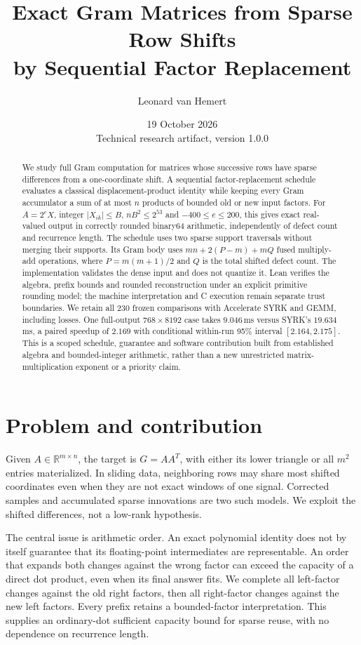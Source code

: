 \documentclass[10pt,a4paper]{article}
\title{Exact Gram Matrices from Sparse Row Shifts\\by Sequential Factor Replacement}
\author{Leonard van Hemert}
\date{19 October 2026\\Technical research artifact, version 1.0.0}
\newcommand{\R}{\mathbb R}
\newcommand{\abs}[1]{\lvert#1\rvert}
\begin{document}
\maketitle
\begin{abstract}
We study full Gram computation for matrices whose successive rows have sparse
differences from a one-coordinate shift. A sequential factor-replacement schedule
evaluates a classical displacement-product identity while keeping every Gram
accumulator a sum of at most $n$ products of bounded old or new input factors.
For $A=2^eX$, integer $\abs{X_{ik}}\le B$, $nB^2\le2^{53}$ and
$-400\le e\le200$, this gives exact real-valued output in correctly rounded
binary64 arithmetic, independently of defect count and recurrence length.
The schedule uses two sparse support traversals without merging their supports.
Its Gram body uses $mn+2(P-m)+mQ$ fused multiply-add operations, where
$P=m(m+1)/2$ and $Q$ is the total shifted defect count. The implementation
validates the dense input and does not quantize it. Lean verifies the algebra,
prefix bounds and rounded reconstruction under an explicit primitive rounding
model; the machine interpretation and C execution remain separate trust
boundaries. We retain all 230 frozen comparisons with Accelerate SYRK and GEMM,
including losses. One full-output $768\times8192$ case takes $9.046$\,ms versus
SYRK's $19.634$\,ms, a paired speedup of $2.169$ with conditional within-run
95\% interval $[2.164,2.175]$. This is a scoped schedule, guarantee and software
contribution built from established algebra and bounded-integer arithmetic,
rather than a new unrestricted matrix-multiplication exponent or a priority claim.
\end{abstract}

\section{Problem and contribution}
Given $A\in\R^{m\times n}$, the target is $G=AA^T$, with either its lower
triangle or all $m^2$ entries materialized. In sliding data, neighboring rows may
share most shifted coordinates even when they are not exact windows of one
signal. Corrected samples and accumulated sparse innovations are two such
models. We exploit the shifted differences, not a low-rank hypothesis.

The central issue is arithmetic order. An exact polynomial identity does not
by itself guarantee that its floating-point intermediates are representable.
An order that expands both changes against the wrong factor can exceed the
capacity of a direct dot product, even when its final answer fits. We complete
all left-factor changes against the old right factors, then all right-factor
changes against the new left factors. Every prefix retains a bounded-factor
interpretation. This supplies an ordinary-dot sufficient capacity bound for
sparse reuse, with no dependence on recurrence length.
\end{document}
